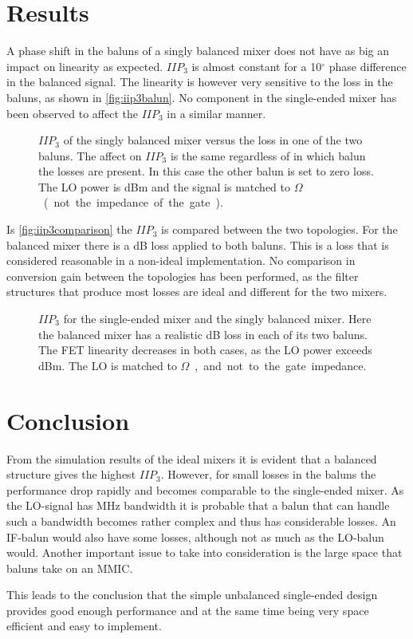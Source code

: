 	\section{Results}
		A phase shift in the baluns of a singly balanced mixer does not have as big an impact on linearity as expected. $IIP_3$ is almost constant for a 10$^\circ$ phase difference in the balanced signal. The linearity is however very sensitive to the loss in the baluns, as shown in \autoref{fig:iip3balun}. No component in the single-ended mixer has been observed to affect the $IIP_3$ in a similar manner.
		
		\begin{figure}[hbt!]
			\centering
			\caption{$IIP_3$ of the singly balanced mixer versus the loss in one of the two baluns. The affect on $IIP_3$ is the same regardless of in which balun the losses are present. In this case the other balun is set to zero loss. The LO power is \unit[12]{dBm} and the signal is matched to \unit[50]{$\Omega$} (not the impedance of the gate).}\label{fig:iip3balun}
		\end{figure}
		
		Is \autoref{fig:iip3comparison} the $IIP_3$ is compared between the two topologies. For the balanced mixer there is a \unit[2]{dB} loss applied to both baluns. This is a loss that is considered reasonable in a non-ideal implementation. No comparison in conversion gain between the topologies has been performed, as the filter structures that produce most losses are ideal and different for the two mixers.

		\begin{figure}[hpt!]
			\centering 
			\caption{$IIP_3$ for  the single-ended mixer and  the singly balanced mixer. Here the balanced mixer has a realistic \unit[2]{dB} loss in each of its two baluns. The FET linearity decreases in both cases, as the LO power exceeds \unit[14]{dBm}. The LO is matched to \unit[50]{$\Omega$}, and not to the gate impedance.}\label{fig:iip3comparison}
		\end{figure}		
		
	\section{Conclusion}
		From the simulation results of the ideal mixers it is evident that a balanced structure gives the highest $IIP_3$. However, for small losses in the baluns the performance drop rapidly and becomes comparable to the single-ended mixer. As the LO-signal has \unit[500]{MHz} bandwidth it is probable that a balun that can handle such a bandwidth becomes rather complex and thus has considerable losses. An IF-balun would also have some losses, although not as much as the LO-balun would. Another important issue to take into consideration is the large space that baluns take on an MMIC.
		
		This leads to the conclusion that the simple unbalanced single-ended design provides good enough performance and at the same time being very space efficient and easy to implement.